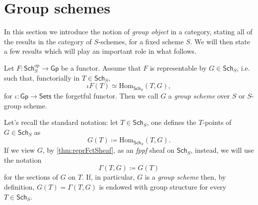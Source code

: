 \section{Group schemes}
In this section we introduce the notion of {\em group object}
in a category, stating all of the results in the category
of $S$-schemes, for a fixed scheme $S$.
We will then state a few results which will play an important role
in what follows.


\begin{defn}
	Let $F\colon \mathsf{Sch}_S^{op} \to \mathsf{Gp}$ be a functor.
	Assume that $F$ is representable by $G \in \mathsf{Sch}_{ S }$, i.e. such that, 
	functorially in $T \in \mathsf{Sch}_{ S }$,
	\begin{equation*}
		\iota F(T) \simeq \mathrm{Hom}_{\mathsf{Sch}_S} \left( T, G \right)
	,\end{equation*} 
	for $\iota\colon \mathsf{Gp} \to \mathsf{Sets}$ the forgetful functor.
	Then we call $G$ a {\em group scheme} over $S$
	or $S$-group scheme.
\end{defn}


\begin{rem}
	Let's recall the standard notation: let $T \in \mathsf{Sch}_{ S }$, one defines
	the $T$-points of $G \in \mathsf{Sch}_{ S }$ as
	\begin{equation*}
		G(T) \coloneqq \mathrm{Hom}_{\mathsf{Sch}_{ S }} \left( T, G \right)
	.\end{equation*} 
	If we view $G$, by \cref{thm:reprFctSheaf}, as an {\em fppf} sheaf on $\mathsf{Sch}_{ S }$, instead,
	we will use the notation
	\begin{equation*}
		\Gamma \left( T, G \right) \coloneqq G(T)
	\end{equation*}
	for the sections of $G$ on $T$.
	If, in particular, $G$ is a {\em group scheme} then, by definition,
	$G(T) = \Gamma(T,G)$ is endowed with group structure for every $T \in \mathsf{Sch}_{ S }$.
\end{rem}


